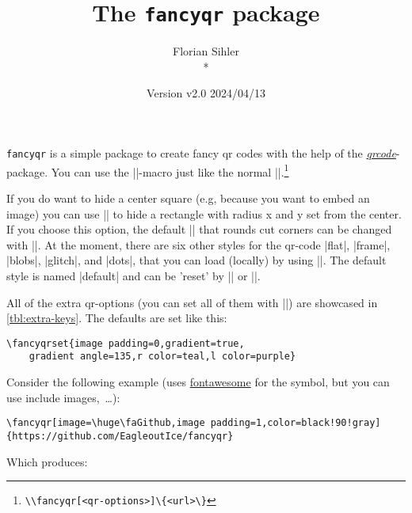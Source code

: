 \documentclass[parskip=half,english,numbers=noenddot,footnotes=nomultiple,oneside]{scrartcl}
\title{The \texttt{fancyqr} package}
\author{%
	\texorpdfstring{Florian Sihler\medskip\\*
		\fancyqr{https://github.com/EagleoutIce/fancyqr}
	}{Florian Sihler}}
\date{Version v2.0 \textendash{} 2024/04/13}
\def\ltx#1{\lstinline/#1/}
\begin{document}
   \maketitle


	\texttt{fancyqr} is a simple package to create fancy qr codes with the help of the \textit{\href{https://www.ctan.org/pkg/qrcode}{qrcode}}-package.
	You can use the |\fancyqr|-macro just like the normal |\qrcode|.\footnote{\ltx{\\fancyqr[<qr-options>]\{<url>\}}}

	If you do want to hide a center square (e.g, because you want to embed an image) you can use || to hide a rectangle with radius x and y set from the center. If you choose this option, the default |\FancyQrRoundCut| that rounds cut corners can be changed with |\FancyQrHardCut|.
	At the moment, there are six other styles for the qr-code |flat|, |frame|, |blobs|, |glitch|, and |dots|, that you can load (locally) by using ||. The default style is named |default| and can be 'reset' by || or |\FancyQrLoadDefault|.

	All of the extra qr-options (you can set all of them with ||) are showcased in \autoref{tbl:extra-keys}.
	The defaults are set like this:
\begin{lstlisting}
\fancyqrset{image padding=0,gradient=true,
	gradient angle=135,r color=teal,l color=purple}
\end{lstlisting}
	Consider the following example (uses \href{https://www.ctan.org/pkg/fontawesome}{fontawesome} for the symbol, but you can use include images,~\ldots):
\begin{lstlisting}
\fancyqr[image=\huge\faGithub,image padding=1,color=black!90!gray]{https://github.com/EagleoutIce/fancyqr}
\end{lstlisting}

	\parbox[c]{.3\linewidth}{Which produces:}\hfill\parbox[c]{.4\linewidth}{\raggedleft{}}\par
\end{document}
